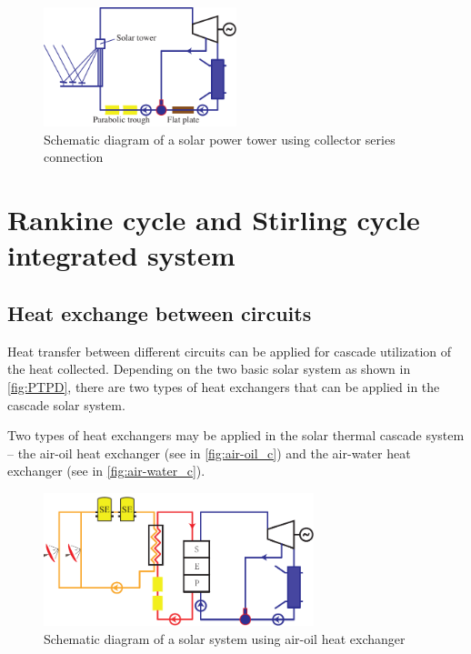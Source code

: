 \begin{figure}[!ht]
\centering 
\includegraphics[width=0.5\textwidth]{fig/SeriesCollection}
\caption{Schematic diagram of a solar power tower using collector series connection}\label{fig:seriesCollection}
\end{figure}

\section{Rankine cycle and Stirling cycle integrated system}

\subsection{Heat exchange between circuits}

Heat transfer between different circuits can be applied for cascade utilization of the heat collected. Depending on the two basic solar system as shown in \autoref{fig:PTPD}, there are two types of heat exchangers that can be applied in the cascade solar system.

Two types of heat exchangers may be applied in the solar thermal cascade system -- the air-oil heat exchanger (see in \autoref{fig:air-oil_c}) and the air-water heat exchanger (see in \autoref{fig:air-water_c}). 

\begin{figure}[h]
\centering 
\includegraphics[width=0.7\textwidth]{fig/air-oil}
\caption{Schematic diagram of a solar system using air-oil heat exchanger}\label{fig:air-oil_c}
\end{figure}


